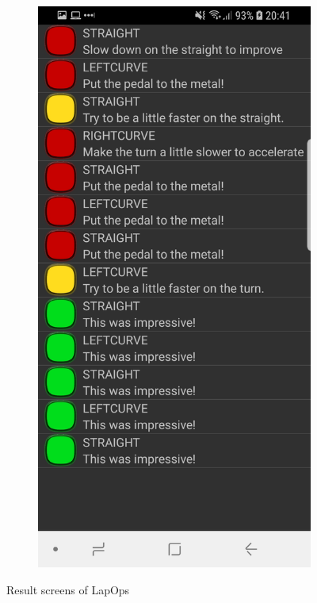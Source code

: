 \begin{figure}[H]
\begin{subfigure}[c]{0.32\textwidth}
	\end{subfigure}
	\hfill
	\begin{subfigure}[c]{0.32\textwidth}
		\includegraphics[width=\textwidth]{Pictures/App/SectionScreen2.jpg}
	\end{subfigure}

	\caption{Result screens of LapOps}
	\label{LapOpsResult}
\end{figure}
\newpage
